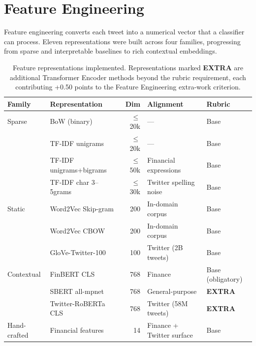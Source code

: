 \documentclass[11pt,a4paper]{article}
\begin{document}
\section{Feature Engineering}

Feature engineering converts each tweet into a numerical vector that a classifier can process.
Eleven representations were built across four families, progressing from sparse and interpretable
baselines to rich contextual embeddings.

\begin{table}[h]
\centering
\small
\begin{tabular}{llrll}
\toprule
\textbf{Family} & \textbf{Representation} & \textbf{Dim} & \textbf{Alignment} & \textbf{Rubric} \\
\midrule
Sparse  & BoW (binary)                  & $\leq$20k & —                        & Base \\
        & TF-IDF unigrams               & $\leq$20k & —                        & Base \\
        & TF-IDF unigrams+bigrams       & $\leq$50k & Financial expressions    & Base \\
        & TF-IDF char 3–5grams          & $\leq$30k & Twitter spelling noise   & Base \\
\midrule
Static  & Word2Vec Skip-gram            & 200       & In-domain corpus         & Base \\
        & Word2Vec CBOW                 & 200       & In-domain corpus         & Base \\
        & GloVe-Twitter-100             & 100       & Twitter (2B tweets)      & Base \\
\midrule
Contextual & FinBERT CLS               & 768       & Finance                  & Base (obligatory) \\
           & SBERT all-mpnet           & 768       & General-purpose          & \textbf{EXTRA} \\
           & Twitter-RoBERTa CLS       & 768       & Twitter (58M tweets)     & \textbf{EXTRA} \\
\midrule
Hand-crafted & Financial features      & 14        & Finance + Twitter surface & Base \\
\bottomrule
\end{tabular}
\caption{Feature representations implemented. Representations marked \textbf{EXTRA} are
additional Transformer Encoder methods beyond the rubric requirement, each contributing
+0.50 points to the Feature Engineering extra-work criterion.}
\label{tab:features}
\end{table}
\end{document}
